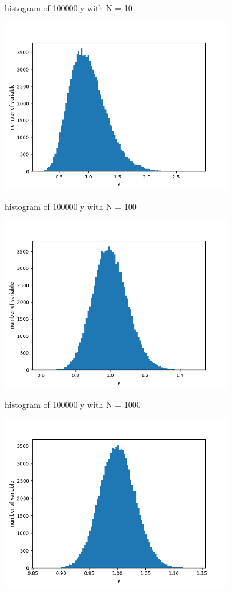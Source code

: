 \documentclass[letterpaper,12pt]{article}
\begin{document}
\begin{table}[!h]
    \centering
    \caption{histogram of 100000 y with N = 10}
    \includegraphics[width=10cm]{ps3-410.png}
    \label{plot10}%
\end{table}%
\newpage

\begin{table}[!h]
    \centering
    \caption{histogram of 100000 y with N = 100}
    \includegraphics[width=10cm]{ps3-4100.png}
    \label{plot100}%
\end{table}%

\begin{table}[!h]
    \centering
    \caption{histogram of 100000 y with N = 1000}
    \includegraphics[width=10cm]{ps3-41000.png}
    \label{plot1000}%
\end{table}%
\end{document}
